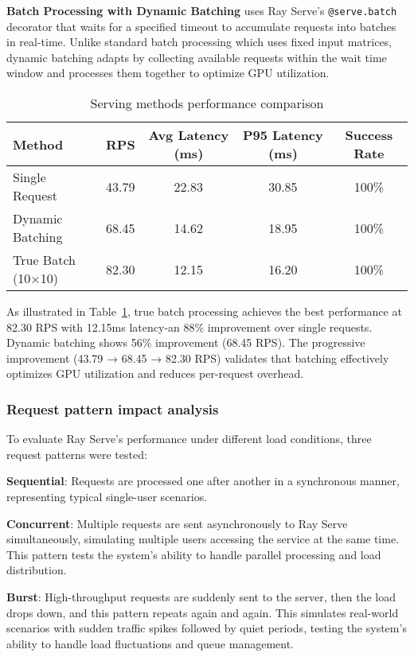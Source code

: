\textbf{Batch Processing with Dynamic Batching} uses Ray Serve's \texttt{@serve.batch} decorator that waits for a specified timeout to accumulate requests into batches in real-time. Unlike standard batch processing which uses fixed input matrices, dynamic batching adapts by collecting available requests within the wait time window and processes them together to optimize GPU utilization.



\begin{table}[htbp]
\centering
\caption{Serving methods performance comparison}
\label{tab:serving_methods}
\begin{tabular}{|l|c|c|c|c|}
\hline
\textbf{Method} & \textbf{RPS} & \textbf{Avg Latency (ms)} & \textbf{P95 Latency (ms)} & \textbf{Success Rate} \\
\hline
Single Request & 43.79 & 22.83 & 30.85 & 100\% \\
Dynamic Batching & 68.45 & 14.62 & 18.95 & 100\% \\
True Batch (10×10) & 82.30 & 12.15 & 16.20 & 100\% \\
\hline
\end{tabular}
\end{table}

As illustrated in Table~\ref{tab:serving_methods}, true batch processing achieves the best performance at 82.30 RPS with 12.15ms latency-an 88\% improvement over single requests. Dynamic batching shows 56\% improvement (68.45 RPS). The progressive improvement (43.79 → 68.45 → 82.30 RPS) validates that batching effectively optimizes GPU utilization and reduces per-request overhead.

\subsubsection{Request pattern impact analysis}

To evaluate Ray Serve's performance under different load conditions, three request patterns were tested:

\textbf{Sequential}: Requests are processed one after another in a synchronous manner, representing typical single-user scenarios.

\textbf{Concurrent}: Multiple requests are sent asynchronously to Ray Serve simultaneously, simulating multiple users accessing the service at the same time. This pattern tests the system's ability to handle parallel processing and load distribution.

\textbf{Burst}: High-throughput requests are suddenly sent to the server, then the load drops down, and this pattern repeats again and again. This simulates real-world scenarios with sudden traffic spikes followed by quiet periods, testing the system's ability to handle load fluctuations and queue management.

